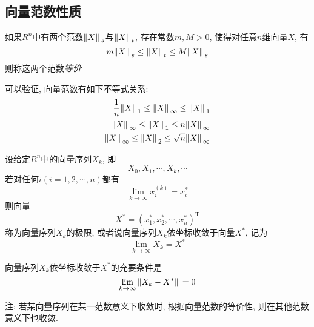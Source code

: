 \subsection{向量范数性质}

\begin{definition}
    如果$R^n$中有两个范数$\norm*{X}_s$与$\norm*{X}_t$, 存在常数$m,M>0$, 使得对任意$n$维向量$X$, 有
    \begin{equation*}
        m\norm*{X}_s\le\norm*{X}_t\le M\norm*{X}_s
    \end{equation*}
    则称这两个范数\emph{等价}
\end{definition}


可以验证, 向量范数有如下不等式关系:
\begin{align*}
    \frac{1}{n}\norm*{X}_1\le\norm*{X}_\infty\le\norm*{X}_1\\
    \norm*{X}_\infty\le\norm*{X}_1\le n\norm*{X}_\infty\\
    \norm*{X}_\infty\le\norm*{X}_2\le\sqrt{n}\norm*{X}_\infty
\end{align*}

\begin{definition}
    设给定$R^n$中的向量序列${X_k}$, 即
    \begin{equation*}
        X_0,X_1,\cdots,X_k,\cdots
    \end{equation*}
    若对任何$i(i=1,2,\cdots,n)$都有
    \begin{equation*}
        \lim\limits_{k\to\infty}x_i^{(k)}=x_i^*
    \end{equation*}
    则向量
    \begin{equation*}
        X^*=(x_1^*,x_2^*,\cdots,x_n^*)^\text{T}
    \end{equation*}
    称为向量序列${X_k}$的极限, 或者说向量序列${X_k}$依坐标收敛于向量$X^*$, 记为
    \begin{equation*}
        \lim\limits_{k\to\infty}X_k=X^*
    \end{equation*}
\end{definition}

\begin{theorem}
    向量序列${X_k}$依坐标收敛于$X^*$的充要条件是
    \begin{equation*}
        \lim\limits_{k\to\infty}\norm*{X_k-X^*}=0
    \end{equation*}
\end{theorem}

注: 若某向量序列在某一范数意义下收敛时, 根据向量范数的等价性, 则在其他范数意义下也收敛.

